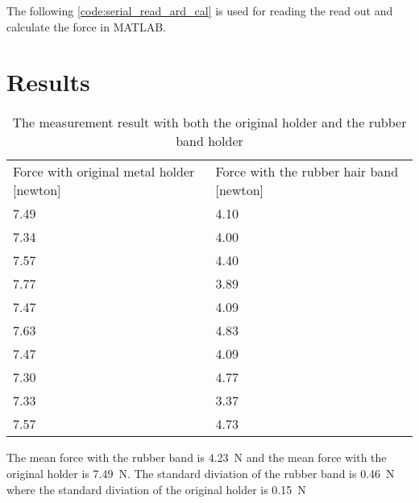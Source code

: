The following \autoref{code:serial_read_ard_cal} is used for reading the read out and calculate the force in MATLAB.



\section*{Results}


\begin{table}[H]
\centering
\caption{The measurement result with both the original holder and the rubber band holder}
\label{apend:weight_result}
\begin{tabular}{ll}
Force with original metal holder [\si{newton}] & Force with the rubber hair band [\si{newton}] \\
7.49                                           & 4.10                                          \\
7.34                                           & 4.00                                          \\
7.57                                           & 4.40                                          \\
7.77                                           & 3.89                                          \\
7.47                                           & 4.09                                          \\
7.63                                           & 4.83                                          \\
7.47                                           & 4.09                                          \\
7.30                                           & 4.77                                          \\
7.33                                           & 3.37                                          \\
7.57                                           & 4.73                                         
\end{tabular}
\end{table}

The mean force with the rubber band is \SI{4.23}{\newton} and the mean force with the original holder is \SI{7.49}{\newton}. The standard diviation of the rubber band is \SI{0.46}{\newton} where the standard diviation of the original holder is \SI{0.15}{\newton} 



